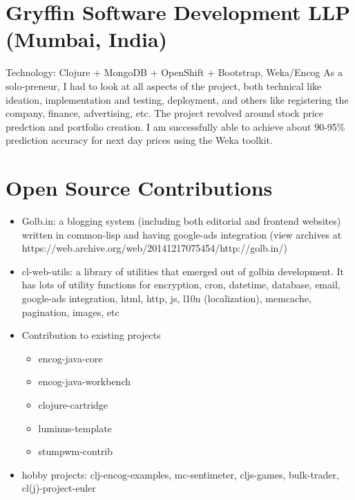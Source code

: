 \section{Gryffin Software Development LLP (Mumbai, India)}
         {}{Technology: Clojure + MongoDB + OpenShift + Bootstrap, Weka/Encog}
         {As a solo-preneur, I had to look at all aspects of the project, both technical like ideation, implementation and testing, deployment, and others like registering the company, finance, advertising, etc. The project revolved around stock price predction and portfolio creation. I am successfully able to achieve about 90-95\% prediction accuracy for next day prices using the Weka toolkit.}

\section{Open Source Contributions}
         {\begin{itemize}
           \item Golb.in: a blogging system (including both editorial and frontend websites) written in common-lisp and having google-ads integration (view archives at https://web.archive.org/web/20141217075454/http://golb.in/)
           \item cl-web-utils: a library of utilities that emerged out of golbin development. It has lots of utility functions for encryption, cron, datetime, database, email, google-ads integration, html, http, js, l10n (localization), memcache, pagination, images, etc
           \item Contribution to existing projects
             \begin{itemize}
             \item encog-java-core
             \item encog-java-workbench
             \item clojure-cartridge
             \item luminus-template
             \item stumpwm-contrib
             \end{itemize}
           \item hobby projects: clj-encog-examples, mc-sentimeter, cljs-games, bulk-trader, cl(j)-project-euler
         \end{itemize}}

